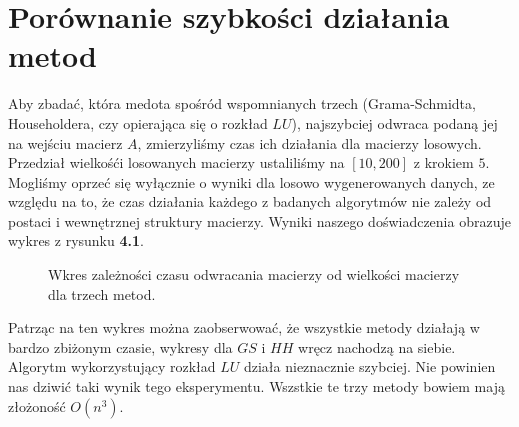 \section{Porównanie szybkości działania metod}
Aby zbadać, która medota spośród wspomnianych trzech (Grama-Schmidta, Householdera, czy
opierająca się o rozkład $LU$), najszybciej odwraca podaną jej na wejściu
macierz $A$, zmierzyliśmy czas ich działania dla macierzy losowych. Przedział
wielkośći losowanych macierzy ustaliliśmy na $[10, 200]$ z krokiem $5$. Mogliśmy
oprzeć się wyłącznie o wyniki dla losowo wygenerowanych danych, ze względu na to,
że czas działania każdego z badanych algorytmów nie zależy od postaci i
wewnętrznej struktury macierzy. Wyniki naszego doświadczenia obrazuje wykres z
rysunku \textbf{4.1}.
\begin{figure}[h!tb]
\begin{center}

\caption{Wkres zależności czasu odwracania macierzy od wielkości macierzy dla trzech metod.}
\end{center}
\end{figure}

Patrząc na ten wykres można zaobserwować, że wszystkie metody działają w bardzo
zbiżonym czasie, wykresy dla $GS$ i $HH$ wręcz nachodzą na siebie. Algorytm
wykorzystujący rozkład $LU$ działa nieznacznie szybciej. Nie powinien nas dziwić
taki wynik tego eksperymentu. Wszstkie te trzy metody bowiem mają złożoność
$O(n^3)$.
